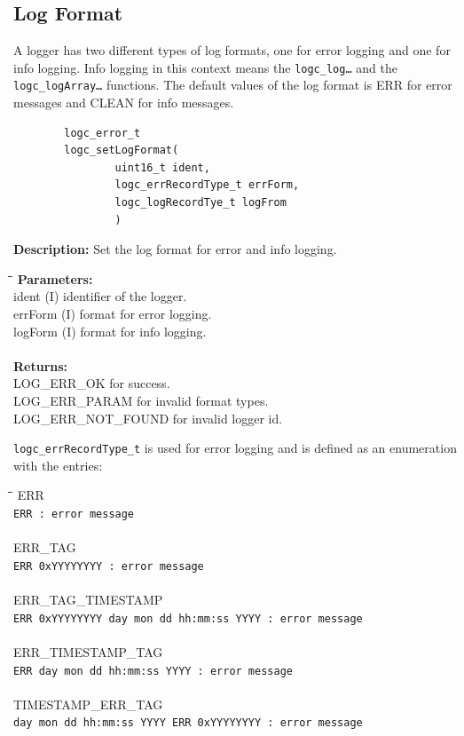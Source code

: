 \documentclass[a4paper, titlepage, 11pt]{article}
\begin{document}
\newpage

\subsection{Log Format}
A logger has two different types of log formats, one for error logging and one
for info logging. Info logging in this context means the \small\verb+logc_log…+
\normalsize and the \small\verb+logc_logArray…+ \normalsize functions. The default values of the log format is ERR for error messages and CLEAN for info messages.
\small
\begin{verbatim}
        logc_error_t
        logc_setLogFormat(
                uint16_t ident,
                logc_errRecordType_t errForm,
                logc_logRecordTye_t logFrom
                )
\end{verbatim}
\normalsize
\textbf{Description:} Set the log format for error and info logging.
\begin{tabbing}
\hspace*{1cm}\=\hspace*{2cm}\=\hspace*{0,6cm}\= \kill
\textbf{Parameters:} \\
\> ident \> (I) identifier of the logger. \\
\> errForm \> (I) format for error logging. \\
\> logForm \> (I) format for info logging. \\ \\
\textbf{Returns:} \\
\> LOG\_ERR\_OK for success. \\
\> LOG\_ERR\_PARAM for invalid format types. \\
\> LOG\_ERR\_NOT\_FOUND for invalid logger id. \\
\end{tabbing}
\small\verb+logc_errRecordType_t+ \normalsize is used for error logging and is defined as an enumeration with the entries:
\begin{tabbing}
\hspace*{1cm}\=\hspace*{2cm}\=\hspace*{0,6cm}\= \kill
\> ERR \\
\> \small\verb+ERR : error message+ \\ \\
\> ERR\_TAG \\
\> \small\verb+ERR 0xYYYYYYYY : error message+ \\ \\
\> ERR\_TAG\_TIMESTAMP \\
\> \small\verb+ERR 0xYYYYYYYY day mon dd hh:mm:ss YYYY : error message+ \\ \\
\> ERR\_TIMESTAMP\_TAG \\
\> \small\verb+ERR day mon dd hh:mm:ss YYYY : error message+ \\ \\
\> TIMESTAMP\_ERR\_TAG \\
\> \small\verb+day mon dd hh:mm:ss YYYY ERR 0xYYYYYYYY : error message+ \\
\end{tabbing}
\end{document}
